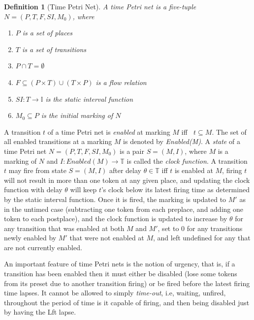 \documentclass{article}
\DeclareMathOperator*{\pre}{^\bullet}
\theoremstyle{Definition}
\newtheorem{definition}{Definition}
\theoremstyle{definition}
\begin{document}
	\begin{definition}[Time Petri Net] \label{tpn} A \textit{time Petri net} is a five-tuple $N = (P, T, F, SI, M_0)$, where 
		\begin{enumerate}
			\item $P$ is a set of places 
			
			\item $T$ is a set of transitions 
			
			\item $P \cap T = \emptyset$ 
			
			\item $F \subseteq (P \times T) \cup (T \times P)$ is a flow relation 
			
			\item $SI : T \rightarrow \mathbb{I}$ is the static interval function 
			
			\item$ M_0 \subseteq P$ is the initial marking of $N$
		\end{enumerate}
	\end{definition}
	
	A transition $t$ of a time Petri net is \textit{enabled} at marking $M$ iff $\pre t \subseteq M$. 
	The set of all enabled transitions at a marking $M$ is denoted by \textit{Enabled(M)}. 
	A \textit{state} of a time Petri net $N = (P, T, F, SI, M_0)$ is a pair $S = (M, I)$, where $M$ is a marking of $N$ and $I : Enabled(M) \rightarrow \mathbb{T}$ is called the \textit{clock function}. 
	A transition $t$ may fire from state $S = (M, I)$ after delay $\theta \in \mathbb{T}$ iff $t$ is enabled at $M$, firing $t$ will not result in more than one token at any given place, and updating the clock function with delay $\theta$ will keep $t$'s clock below its latest firing time as determined by the static interval function. 
	Once it is fired, the marking is updated to $M'$ as in the untimed case (subtracting one token from each preplace, and adding one token to each postplace), and the clock function is updated to increase by $\theta$ for any transition that was enabled at both $M$ and $M'$, set to 0 for any transitions newly enabled by $M'$ that were not enabled at $M$, and left undefined for any that are not currently enabled. 
	
	An important feature of time Petri nets is the notion of urgency, that is, if a transition has been enabled then it must either be disabled (lose some tokens from its preset due to another transition firing) or be fired before the latest firing time lapses. 
	It cannot be allowed to simply \emph{time-out}, i.e, waiting, unfired, throughout the period of time is it capable of firing, and then being disabled just by having the Lft lapse.  
	
\end{document}
